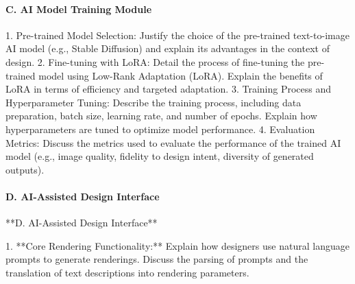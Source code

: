 \documentclass{article}
\begin{document}
\paragraph{C. AI Model Training Module}
      1. Pre-trained Model Selection: Justify the choice of the pre-trained text-to-image AI model (e.g., Stable Diffusion) and explain its advantages in the context of design.
      2. Fine-tuning with LoRA: Detail the process of fine-tuning the pre-trained model using Low-Rank Adaptation (LoRA).  Explain the benefits of LoRA in terms of efficiency and targeted adaptation.
      3. Training Process and Hyperparameter Tuning: Describe the training process, including data preparation, batch size, learning rate, and number of epochs.  Explain how hyperparameters are tuned to optimize model performance.
      4. Evaluation Metrics:  Discuss the metrics used to evaluate the performance of the trained AI model (e.g., image quality, fidelity to design intent, diversity of generated outputs).

\paragraph{D. AI-Assisted Design Interface}
   **D. AI-Assisted Design Interface**

      1.  **Core Rendering Functionality:** Explain how designers use natural language prompts to generate renderings. Discuss the parsing of prompts and the translation of text descriptions into rendering parameters.
\end{document}
